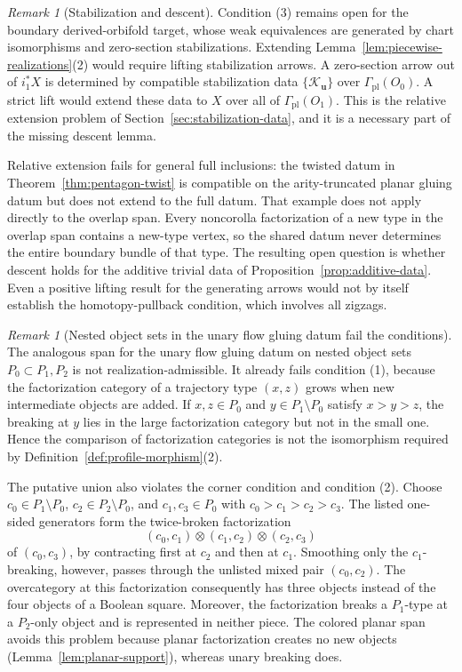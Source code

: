 \documentclass[11pt,letterpaper,twoside]{article}
\theoremstyle{plain}
\theoremstyle{definition}
\theoremstyle{remark}
\newtheorem{remark}[theorem]{Remark}
\begin{document}
\begin{remark}[Stabilization and descent]\label{rem:overlap-stabilization}
Condition (3) remains open for the boundary derived-orbifold target, whose weak equivalences are generated by chart isomorphisms and zero-section stabilizations.  Extending Lemma~\ref{lem:piecewise-realizations}(2) would require lifting stabilization arrows.  A zero-section arrow out of \(i_1^*X\) is determined by compatible stabilization data \(\{\mathcal K_{\mathbf u}\}\) over \(\Gamma_{\mathrm{pl}}(O_0)\).  A strict lift would extend these data to \(X\) over all of \(\Gamma_{\mathrm{pl}}(O_1)\).  This is the relative extension problem of Section~\ref{sec:stabilization-data}, and it is a necessary part of the missing descent lemma.

Relative extension fails for general full inclusions: the twisted datum in Theorem~\ref{thm:pentagon-twist} is compatible on the arity-truncated planar gluing datum but does not extend to the full datum.  That example does not apply directly to the overlap span.  Every noncorolla factorization of a new type in the overlap span contains a new-type vertex, so the shared datum never determines the entire boundary bundle of that type.  The resulting open question is whether descent holds for the additive trivial data of Proposition~\ref{prop:additive-data}.  Even a positive lifting result for the generating arrows would not by itself establish the homotopy-pullback condition, which involves all zigzags.
\end{remark}

\begin{remark}[Nested object sets in the unary flow gluing datum fail the conditions]\label{rem:flow-span-fails}
The analogous span for the unary flow gluing datum on nested object sets \(P_0\subset P_1,P_2\) is not realization-admissible.  It already fails condition (1), because the factorization category of a trajectory type \((x,z)\) grows when new intermediate objects are added.  If \(x,z\in P_0\) and \(y\in P_1\setminus P_0\) satisfy \(x>y>z\), the breaking at \(y\) lies in the large factorization category but not in the small one.  Hence the comparison of factorization categories is not the isomorphism required by Definition~\ref{def:profile-morphism}(2).

The putative union also violates the corner condition and condition (2).  Choose \(c_0\in P_1\setminus P_0\), \(c_2\in P_2\setminus P_0\), and \(c_1,c_3\in P_0\) with \(c_0>c_1>c_2>c_3\).  The listed one-sided generators form the twice-broken factorization
\[
 (c_0,c_1)\otimes(c_1,c_2)\otimes(c_2,c_3)
\]
of \((c_0,c_3)\), by contracting first at \(c_2\) and then at \(c_1\).  Smoothing only the \(c_1\)-breaking, however, passes through the unlisted mixed pair \((c_0,c_2)\).  The overcategory at this factorization consequently has three objects instead of the four objects of a Boolean square.  Moreover, the factorization breaks a \(P_1\)-type at a \(P_2\)-only object and is represented in neither piece.  The colored planar span avoids this problem because planar factorization creates no new objects (Lemma~\ref{lem:planar-support}), whereas unary breaking does.
\end{remark}
\end{document}
